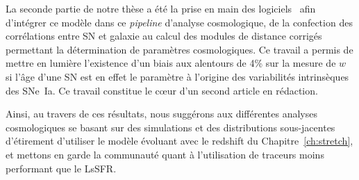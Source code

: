 \documentclass[../main/main.tex]{subfiles}
\begin{document}
La seconde partie de notre thèse a été la prise en main des logiciels \snana\
afin d'intégrer ce modèle dans ce \textit{pipeline} d'analyse cosmologique, de
la confection des corrélations entre SN et galaxie au calcul des modules de
distance corrigés permettant la détermination de paramètres cosmologiques. Ce
travail a permis de mettre en lumière l'existence d'un biais aux alentours de
4\% sur la mesure de $w$ si l'âge d'une SN est en effet le paramètre à l'origine
des variabilités intrinsèques des SNe~Ia. Ce travail constitue le cœur d'un
second article en rédaction.

Ainsi, au travers de ces résultats, nous suggérons aux différentes analyses
cosmologiques se basant sur des simulations et des distributions sous-jacentes
d'étirement d'utiliser le modèle évoluant avec le redshift du
Chapitre~\ref{ch:stretch}, et mettons en garde la communauté quant à
l'utilisation de traceurs moins performant que le LsSFR.


\shorthandoff{:}

\end{document}
